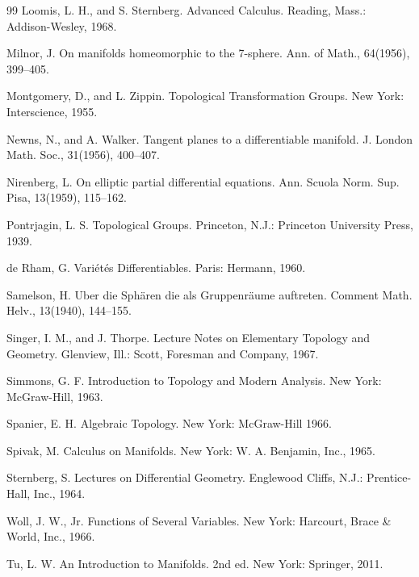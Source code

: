 \begin{thebibliography}{99}
   Loomis, L. H., and S. Sternberg. Advanced Calculus. Reading, Mass.: Addison-Wesley, 1968.

   Milnor, J. On manifolds homeomorphic to the 7-sphere. Ann. of Math., 64(1956), 399–405.

   Montgomery, D., and L. Zippin. Topological Transformation Groups. New York: Interscience, 1955.

   Newns, N., and A. Walker. Tangent planes to a differentiable manifold. J. London Math. Soc., 31(1956), 400–407.

   Nirenberg, L. On elliptic partial differential equations. Ann. Scuola Norm. Sup. Pisa, 13(1959), 115–162.

   Pontrjagin, L. S. Topological Groups. Princeton, N.J.: Princeton University Press, 1939.

   de Rham, G. Variétés Differentiables. Paris: Hermann, 1960.

   Samelson, H. Uber die Sphären die als Gruppenräume auftreten. Comment Math. Helv., 13(1940), 144–155.

   Singer, I. M., and J. Thorpe. Lecture Notes on Elementary Topology and Geometry. Glenview, Ill.: Scott, Foresman and Company, 1967.

   Simmons, G. F. Introduction to Topology and Modern Analysis. New York: McGraw-Hill, 1963.

   Spanier, E. H. Algebraic Topology. New York: McGraw-Hill 1966.

   Spivak, M. Calculus on Manifolds. New York: W. A. Benjamin, Inc., 1965.

   Sternberg, S. Lectures on Differential Geometry. Englewood Cliffs, N.J.: Prentice-Hall, Inc., 1964.

   Woll, J. W., Jr. Functions of Several Variables. New York: Harcourt, Brace \& World, Inc., 1966.

   Tu, L. W. An Introduction to Manifolds. 2nd ed. New York: Springer, 2011.
\end{thebibliography}


